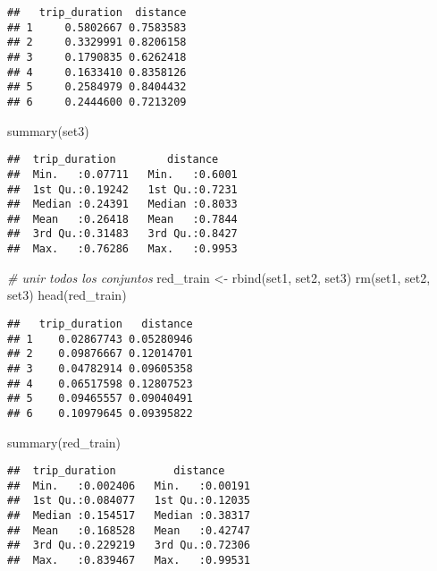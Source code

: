 \documentclass[
]{article}
\newenvironment{Shaded}{\begin{snugshade}}{\end{snugshade}}
\newcommand{\CommentTok}[1]{\textcolor[rgb]{0.56,0.35,0.01}{\textit{#1}}}
\newcommand{\FunctionTok}[1]{\textcolor[rgb]{0.00,0.00,0.00}{#1}}
\newcommand{\NormalTok}[1]{#1}
\newcommand{\OtherTok}[1]{\textcolor[rgb]{0.56,0.35,0.01}{#1}}
\begin{document}
\begin{verbatim}
##   trip_duration  distance
## 1     0.5802667 0.7583583
## 2     0.3329991 0.8206158
## 3     0.1790835 0.6262418
## 4     0.1633410 0.8358126
## 5     0.2584979 0.8404432
## 6     0.2444600 0.7213209
\end{verbatim}

\begin{Shaded}
\begin{Highlighting}[]
\FunctionTok{summary}\NormalTok{(set3)}
\end{Highlighting}
\end{Shaded}

\begin{verbatim}
##  trip_duration        distance     
##  Min.   :0.07711   Min.   :0.6001  
##  1st Qu.:0.19242   1st Qu.:0.7231  
##  Median :0.24391   Median :0.8033  
##  Mean   :0.26418   Mean   :0.7844  
##  3rd Qu.:0.31483   3rd Qu.:0.8427  
##  Max.   :0.76286   Max.   :0.9953
\end{verbatim}

\begin{Shaded}
\begin{Highlighting}[]
\CommentTok{\# unir todos los conjuntos}
\NormalTok{red\_train }\OtherTok{\textless{}{-}} \FunctionTok{rbind}\NormalTok{(set1, set2, set3)}
\FunctionTok{rm}\NormalTok{(set1, set2, set3)}
\FunctionTok{head}\NormalTok{(red\_train)}
\end{Highlighting}
\end{Shaded}

\begin{verbatim}
##   trip_duration   distance
## 1    0.02867743 0.05280946
## 2    0.09876667 0.12014701
## 3    0.04782914 0.09605358
## 4    0.06517598 0.12807523
## 5    0.09465557 0.09040491
## 6    0.10979645 0.09395822
\end{verbatim}

\begin{Shaded}
\begin{Highlighting}[]
\FunctionTok{summary}\NormalTok{(red\_train)}
\end{Highlighting}
\end{Shaded}

\begin{verbatim}
##  trip_duration         distance      
##  Min.   :0.002406   Min.   :0.00191  
##  1st Qu.:0.084077   1st Qu.:0.12035  
##  Median :0.154517   Median :0.38317  
##  Mean   :0.168528   Mean   :0.42747  
##  3rd Qu.:0.229219   3rd Qu.:0.72306  
##  Max.   :0.839467   Max.   :0.99531
\end{verbatim}
\end{document}
